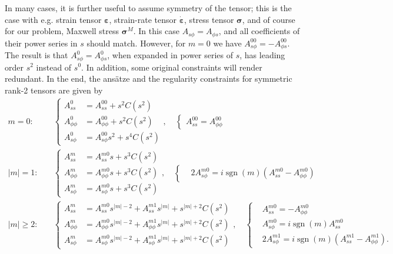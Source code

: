 \documentclass[a4paper, 11pt]{article}
\DeclareMathOperator{\sgn}{sgn}
\begin{document}
In many cases, it is further useful to assume symmetry of the tensor; this is the case with e.g. strain tensor $\bm{\varepsilon}$, strain-rate tensor $\dot{\bm{\varepsilon}}$, stress tensor $\bm{\sigma}$, and of course for our problem, Maxwell stress $\bm{\sigma}^M$. In this case $A_{s\phi} = A_{\phi s}$, and all coefficients of their power series in $s$ should match. However, for $m=0$ we have $A_{s\phi}^{00} = -A_{\phi s}^{00}$. The result is that $A_{s\phi}^0 = A_{\phi s}^0$, when expanded in power series of $s$, has leading order $s^2$ instead of $s^0$. In addition, some original constraints will render redundant. In the end, the ansätze and the regularity constraints for symmetric rank-2 tensors are given by
\begin{equation}
    \begin{aligned}
        m = 0 :& \quad \left\{\begin{aligned}
            A_{ss}^0 &= A_{ss}^{00} + s^2 C(s^2) \\ 
            A_{\phi\phi}^0 &= A_{\phi\phi}^{00} + s^2 C(s^2) \\ 
            A_{s\phi}^0 &= A_{s\phi}^{00} s^2 + s^4 C(s^2) 
        \end{aligned}\right.,\quad 
        \left\{\begin{aligned}
            A_{ss}^{00} = A_{\phi\phi}^{00}
        \end{aligned}\right. \\ 
        |m| = 1 :& \quad \left\{\begin{aligned}
            A_{ss}^m &= A_{ss}^{m0} s + s^3 C(s^2) \\
            A_{\phi\phi}^m &= A_{\phi\phi}^{m0} s + s^{3} C(s^2) \\
            A_{s\phi}^m &= A_{s\phi}^{m0} s + s^{3} C(s^2) 
        \end{aligned}\right.,\quad \left\{\begin{aligned}
            & 2A_{s\phi}^{m0} = i\sgn(m) \left(A_{ss}^{m0} - A_{\phi\phi}^{m0}\right)
        \end{aligned}\right. \\
        |m| \geq 2 :& \quad \left\{\begin{aligned}
            A_{ss}^m &= A_{ss}^{m0} s^{|m|-2} + A_{ss}^{m1} s^{|m|} + s^{|m|+2} C(s^2) \\
            A_{\phi\phi}^m &= A_{\phi\phi}^{m0} s^{|m|-2} + A_{\phi \phi}^{m1} s^{|m|} + s^{|m|+2} C(s^2) \\
            A_{s\phi}^m &= A_{s\phi}^{m0} s^{|m|-2} + A_{s\phi}^{m1} s^{|m|} + s^{|m|+2} C(s^2)
        \end{aligned}\right.,\quad \left\{\begin{aligned}
            &A_{ss}^{m0} = - A_{\phi\phi}^{m0}\\
            &A_{s\phi}^{m0} = i \sgn(m) A_{ss}^{m0} \\ 
            &2 A_{s\phi}^{m1} = i\sgn(m)\left(A_{ss}^{m1} - A_{\phi\phi}^{m1}\right).
        \end{aligned}\right.
    \end{aligned}
\end{equation}
\end{document}
